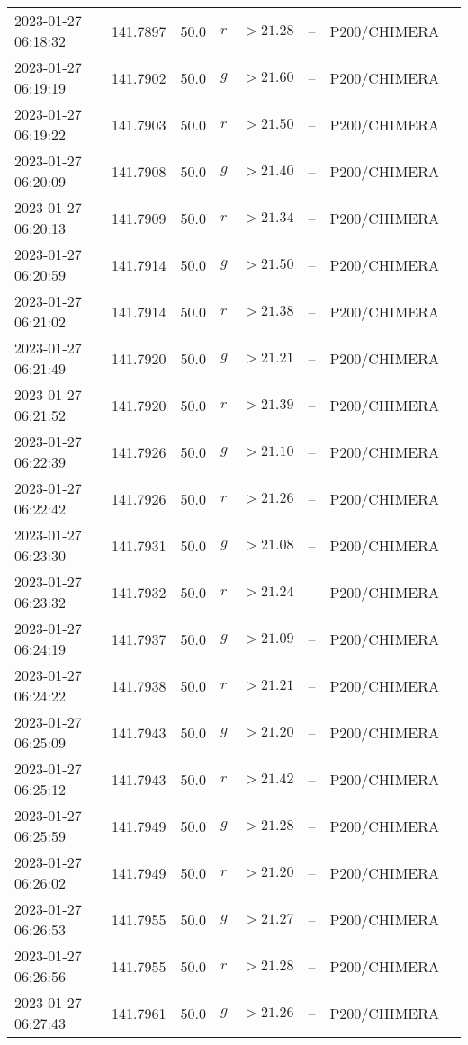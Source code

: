 \documentclass{nature_plusfigure}
\begin{document}
\begin{supplement}
\begin{center}
\begin{longtable}{llllllll}
2023-01-27 06:18:32 & 141.7897 & 50.0 & $r$ & $>21.28$ & -- & P200/CHIMERA &  \\ 
2023-01-27 06:19:19 & 141.7902 & 50.0 & $g$ & $>21.60$ & -- & P200/CHIMERA &  \\ 
2023-01-27 06:19:22 & 141.7903 & 50.0 & $r$ & $>21.50$ & -- & P200/CHIMERA &  \\ 
2023-01-27 06:20:09 & 141.7908 & 50.0 & $g$ & $>21.40$ & -- & P200/CHIMERA &  \\ 
2023-01-27 06:20:13 & 141.7909 & 50.0 & $r$ & $>21.34$ & -- & P200/CHIMERA &  \\ 
2023-01-27 06:20:59 & 141.7914 & 50.0 & $g$ & $>21.50$ & -- & P200/CHIMERA &  \\ 
2023-01-27 06:21:02 & 141.7914 & 50.0 & $r$ & $>21.38$ & -- & P200/CHIMERA &  \\ 
2023-01-27 06:21:49 & 141.7920 & 50.0 & $g$ & $>21.21$ & -- & P200/CHIMERA &  \\ 
2023-01-27 06:21:52 & 141.7920 & 50.0 & $r$ & $>21.39$ & -- & P200/CHIMERA &  \\ 
2023-01-27 06:22:39 & 141.7926 & 50.0 & $g$ & $>21.10$ & -- & P200/CHIMERA &  \\ 
2023-01-27 06:22:42 & 141.7926 & 50.0 & $r$ & $>21.26$ & -- & P200/CHIMERA &  \\ 
2023-01-27 06:23:30 & 141.7931 & 50.0 & $g$ & $>21.08$ & -- & P200/CHIMERA &  \\ 
2023-01-27 06:23:32 & 141.7932 & 50.0 & $r$ & $>21.24$ & -- & P200/CHIMERA &  \\ 
2023-01-27 06:24:19 & 141.7937 & 50.0 & $g$ & $>21.09$ & -- & P200/CHIMERA &  \\ 
2023-01-27 06:24:22 & 141.7938 & 50.0 & $r$ & $>21.21$ & -- & P200/CHIMERA &  \\ 
2023-01-27 06:25:09 & 141.7943 & 50.0 & $g$ & $>21.20$ & -- & P200/CHIMERA &  \\ 
2023-01-27 06:25:12 & 141.7943 & 50.0 & $r$ & $>21.42$ & -- & P200/CHIMERA &  \\ 
2023-01-27 06:25:59 & 141.7949 & 50.0 & $g$ & $>21.28$ & -- & P200/CHIMERA &  \\ 
2023-01-27 06:26:02 & 141.7949 & 50.0 & $r$ & $>21.20$ & -- & P200/CHIMERA &  \\ 
2023-01-27 06:26:53 & 141.7955 & 50.0 & $g$ & $>21.27$ & -- & P200/CHIMERA &  \\ 
2023-01-27 06:26:56 & 141.7955 & 50.0 & $r$ & $>21.28$ & -- & P200/CHIMERA &  \\ 
2023-01-27 06:27:43 & 141.7961 & 50.0 & $g$ & $>21.26$ & -- & P200/CHIMERA &  \\ 

\end{longtable}
\end{center}
\end{supplement}
\end{document}
